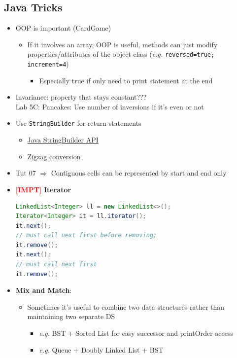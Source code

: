 \documentclass{article}
\newcommand{\eg}[0]{\textit{e.g. }}
\newcommand{\impt}[0]{\textcolor{red}{\textbf{[IMPT] }}}
\begin{document}
\begin{multicols}{2}
\section{Java Tricks}
\begin{itemize}
	\item OOP is important (CardGame)
	\begin{itemize}
		\item If it involves an array, OOP is useful, methods can just modify properties/attributes of the object class (\eg \texttt{reversed=true; increment=4})
		\begin{itemize}
			\item Especially true if only need to print statement at the end
		\end{itemize}
	\end{itemize}
	\item Invariance: property that stays constant???\\
	Lab 5C: Pancakes: Use number of inversions if it's even or not
	\item Use \texttt{StringBuilder} for return statements
	\begin{itemize}
		\item \href{https://docs.oracle.com/javase/7/docs/api/java/lang/StringBuilder.html}{Java StringBuilder API}
		\item \href{https://leetcode.com/problems/zigzag-conversion/solution/}{Zigzag conversion}
	\end{itemize}
    \item Tut 07 $\Rightarrow$ Contiguous cells can be represented by start and end only
    \item \impt \textbf{Iterator}
    \begin{lstlisting}[language=Java]
LinkedList<Integer> ll = new LinkedList<>();
Iterator<Integer> it = ll.iterator();
it.next();
// must call next first before removing;
it.remove();
it.next();
// must call next first
it.remove();
\end{lstlisting}
    \item \textbf{Mix and Match}:
    \begin{itemize}
    	\item Sometimes it's useful to combine two data structures rather than maintaining two separate DS
    	\begin{itemize}
    		\item \eg BST + Sorted List for easy successor and printOrder access
    		\item \eg Queue + Doubly Linked List + BST
    	\end{itemize}
    \end{itemize}

\end{itemize}

\end{multicols}
\end{document}
